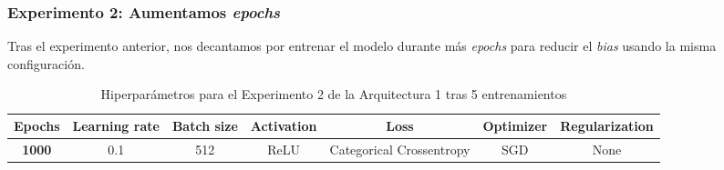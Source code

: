 \documentclass{article}
\begin{document}
		\subsubsection{Experimento 2: Aumentamos \textit{epochs}}
		\label{d-s-a1-e2}
			Tras el experimento anterior, nos decantamos por entrenar el modelo durante m\'as \textit{epochs} para reducir el \textit{bias} usando la misma configuraci\'on.\\
			\begin{table}[!h]
				\begin{center}
					\begin{tabular}{| c | c | c | c | c | c | c |}
						\textbf{Epochs} & \textbf{Learning rate} & \textbf{Batch size} & \textbf{Activation} & \textbf{Loss} & \textbf{Optimizer} & \textbf{Regularization} \\ \hline
						\textbf{1000} & 0.1 & 512 & ReLU & Categorical Crossentropy & SGD & None
					\end{tabular}
					\caption{Hiperpar\'ametros para el Experimento 2 de la Arquitectura 1 tras 5 entrenamientos}
					\label{tab:hip-d-a1-e2}
				\end{center}
			\end{table}
			
\end{document}
